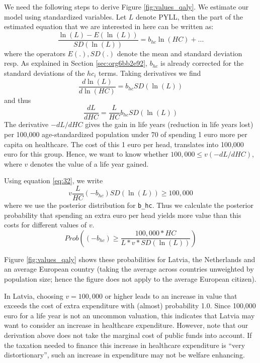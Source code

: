 \documentclass[a4paper,12pt]{article}
\begin{document}
We need the following steps to derive Figure \ref{fig:values_qaly}. We estimate our model using standardized variables. Let \(L\) denote PYLL, then the part of the estimated equation that we are interested in here can be written as:
\begin{equation}
\label{eq:27}
\frac{\ln(L)-E(\ln(L))}{SD(\ln(L))} = b_{hc} \ln(HC) + ...
\end{equation}
where the operators \(E(.),SD(.)\) denote the mean and standard deviation resp. As explained in Section \ref{sec:org6bb2e92}, \(b_{hc}\) is already corrected for the standard deviations of the \(hc_i\) terms. Taking derivatives we find
\begin{equation}
\label{eq:31}
\frac{d \ln(L)}{d \ln(HC)} = b_{hc} SD(\ln(L))
\end{equation}
and thus
\begin{equation}
\label{eq:32}
\frac{dL}{dHC} = \frac{L}{HC} b_{hc} SD(\ln(L))
\end{equation}
The derivative \(-dL/dHC\) gives the gain in life years (reduction in life years lost) per 100,000 age-standardized population under 70 of spending 1 euro more per capita on healthcare. The cost of this 1 euro per head, translates into 100,000 euro for this group. Hence, we want to know whether \(100,000 \leq v (-dL/dHC)\), where \(v\) denotes the value of a life year gained. 

Using equation \eqref{eq:32}, we write
\begin{equation}
\label{eq:22}
v \frac{L}{HC} (-b_{hc}) SD(\ln(L)) \geq 100,000
\end{equation}
where we use the posterior distribution for \texttt{b\_hc}. Thus we calculate the posterior probability that spending an extra euro per head yields more value than this costs for different values of \(v\).
\begin{equation}
\label{eq:41}
Prob \left((-b_{hc}) \geq \frac{100,000 * HC}{L* v *SD(\ln(L))}\right)
\end{equation}

Figure \ref{fig:values_qaly} shows these probabilities for Latvia, the Netherlands and an average European country (taking the average across countries unweighted by population size; hence the figure does not apply to the average European citizen).

In Latvia, choosing \(v = 100,000\) or higher leads to an increase in value that exceeds the cost of extra expenditure with (almost) probability 1.0. Since 100,000 euro for a life year is not an uncommon valuation, this indicates that Latvia may want to consider an increase in healthcare expenditure. However, note that our derivation above does not take the marginal cost of public funds into account. If the taxation needed to finance this increase in healthcare expenditure is ``very distortionary'', such an increase in expenditure may not be welfare enhancing.
\end{document}
